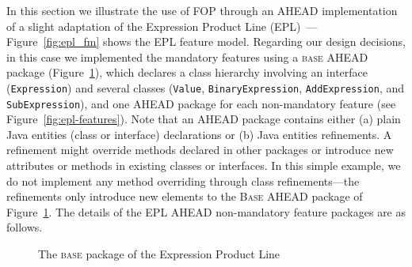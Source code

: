 In this section we illustrate the use of FOP through an AHEAD implementation 
of a slight adaptation of the Expression Product 
Line (EPL)~\cite{batory:ecoop2005}---Figure~\ref{fig:epl_fm} shows 
the EPL feature model. Regarding our design decisions, 
in this case we implemented the mandatory features using a \textsc{base} AHEAD package (Figure~\ref{fig:epl-base}), which
declares a class hierarchy involving an interface (\texttt{Expression}) and
several classes (\texttt{Value}, \texttt{BinaryExpression}, \texttt{AddExpression}, and 
\texttt{SubExpression}), and one AHEAD package for each non-mandatory feature (see Figure~\ref{fig:epl-features}). Note 
that an AHEAD package contains either (a) plain Java entities (class or interface) declarations or (b) 
Java entities refinements. A refinement 
might override methods declared in other packages or 
introduce new attributes or methods in existing classes 
or interfaces. In this simple example, we do not implement any 
method overriding through class refinements---the refinements 
only introduce new elements to the \textsc{Base} AHEAD package 
of Figure~\ref{fig:epl-base}. The details of the EPL 
AHEAD non-mandatory feature packages are as follows. 

 
\begin{figure}[htb]
    \caption{The \textsc{base} package of the Expression Product Line}
    \label{fig:epl-base}
\end{figure} 


